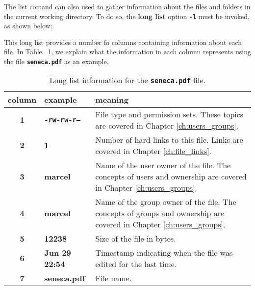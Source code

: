 The list comand can also used to gather information about the files and folders in the current working directory. To do so, the \textbf{long list} option \textbf{\texttt{-l}} must be invoked, as shown below:
This long list provides a number fo columns containing information about each file. In Table~ \ref{tab:ch2_list}, we explain what the information in each column represents using the file \textbf{\texttt{seneca.pdf}} as an example.

\begin{table}[!htbp]
   \myfloatalign
   \begin{tabularx}{\textwidth}{cXp{70mm}} \toprule
   \textbf{column} & \textbf{example} & \textbf{meaning} \\ \bottomrule
   \textbf{1} & \textbf{\texttt{-rw-rw-r--}} & File type and permission sets. These topics are covered in Chapter \ref{ch:users_groups}.\\
   \textbf{2} & \textbf{1} & Number of hard links to this file. Links are covered in Chapter \ref{ch:file_links}.\\
   \textbf{3} & \textbf{marcel} & Name of the user owner of the file. The concepts of users and ownership are covered in Chapter \ref{ch:users_groups}.\\
   \textbf{4} & \textbf{marcel} & Name of the group owner of the file. The concepts of groups and ownership are covered in Chapter \ref{ch:users_groups}.\\
   \textbf{5} & \textbf{12238} & Size of the file in bytes.\\
   \textbf{6} & \textbf{Jun 29 22:54} & Timestamp indicating when the file was edited for the last time.\\
   \textbf{7} & \textbf{seneca.pdf} & File name.\\
   \bottomrule
   \end{tabularx}
\caption{Long list information for the \textbf{\texttt{seneca.pdf}} file.}
\label{tab:ch2_list}
\end{table}

